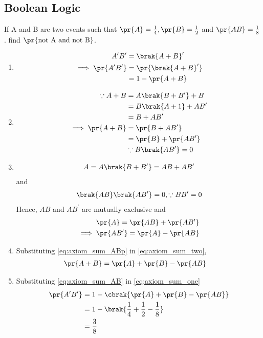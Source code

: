 \subsection{Boolean Logic}
If A and B are two events such that $\pr{A} = \frac{1}{4}, \pr{B} = \frac{1}{2}$ and $\pr{A B} = \frac{1}{8}$. find $\pr{\text{not A and not B}}$.
\renewcommand{\theequation}{\theenumi}
\begin{enumerate}[label=\thesubsection.\arabic*.,ref=\thesubsection.\theenumi]

\item 
\begin{align}
A^{\prime}B^{\prime} &=  \brak{A+B}^{\prime}
\\
\implies \pr{A^{\prime}B^{\prime}} &=  \pr{\brak{A+B}^{\prime}} 
\\
&= 1 - \pr{A+B} 
\label{eq:axiom_sum_one}
\end{align}
\item 
\begin{align}
\because A+B &= A\brak{B+B^{\prime}} + B
\\
&= B \brak{A +1} + A B^{\prime}
\\
&=B + A B^{\prime}
\\
\implies \pr{A+B} &= \pr{B + A B^{\prime} }
\\
&=\pr{B}+\pr{ A B^{\prime} } 
\\
&\because B \brak{ A B^{\prime} } = 0
\label{eq:axiom_sum_two}
\end{align}
\item 
\begin{align}
A = A \brak{B+B^{\prime}} =  AB + AB^{\prime}
\label{eq:axiom_sum_A}
\end{align}
and 
\begin{align}
\brak{ AB}\brak{  AB^{\prime}} = 0, \because BB^{\prime} = 0
\label{eq:axiom_sum_AB0}
\end{align}
Hence, $AB$ and $AB^{\prime}$ are mutually exclusive and 
%
\begin{align}
\pr{A} = \pr{AB} + \pr{AB^{\prime}}
\\
\implies 
\pr{AB^{\prime}} =  \pr{A} - \pr{AB}
\label{eq:axiom_sum_ABp}
\end{align}
\item Substituting \eqref{eq:axiom_sum_ABp} in \eqref{eq:axiom_sum_two}, 
\begin{align}
\pr{A+B} &= \pr{A} + \pr{B} - \pr{AB} 
\label{eq:axiom_sum_AB}
\end{align}
\item Substituting \eqref{eq:axiom_sum_AB} in \eqref{eq:axiom_sum_one}
\begin{align}
\pr{A^{\prime}B^{\prime}} &=  1 - \cbrak{\pr{A} + \pr{B} - \pr{AB} }
\\
&= 1 - \brak{\frac{1}{4} + \frac{1}{2} - \frac{1}{8}}
\\
&= \frac{3}{8}
\label{eq:axiom_sum_final}
\end{align}
\end{enumerate}

